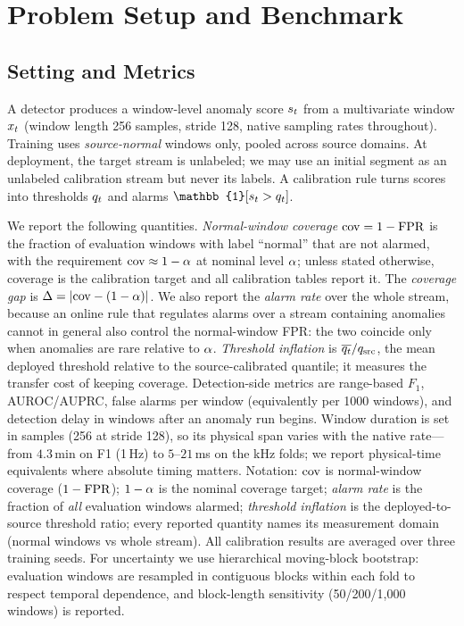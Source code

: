 \section{Problem Setup and Benchmark}
\label{sec:benchmark}

\subsection{Setting and Metrics}
\label{sec:setup-metrics}
A detector produces a window-level anomaly score $s_t$ from a multivariate window $x_t$ (window length 256 samples, stride 128, native sampling rates throughout). Training uses \emph{source-normal} windows only, pooled across source domains. At deployment, the target stream is unlabeled; we may use an initial segment as an unlabeled calibration stream but never its labels. A calibration rule turns scores into thresholds $q_t$ and alarms $\mathbb{1}[\st > \qt]$.

We report the following quantities. \emph{Normal-window coverage} $\mathrm{cov} = 1-\mathrm{FPR}$ is the fraction of evaluation windows with label ``normal'' that are not alarmed, with the requirement $\mathrm{cov} \approx 1-\alpha$ at nominal level $\alpha$; unless stated otherwise, coverage is the calibration target and all calibration tables report it. The \emph{coverage gap} is $\Delta = |\mathrm{cov}-(1-\alpha)|$. We also report the \emph{alarm rate} over the whole stream, because an online rule that regulates alarms over a stream containing anomalies cannot in general also control the normal-window FPR: the two coincide only when anomalies are rare relative to $\alpha$. \emph{Threshold inflation} is $\overline{q_t}/q_{\mathrm{src}}$, the mean deployed threshold relative to the source-calibrated quantile; it measures the transfer cost of keeping coverage. Detection-side metrics are range-based $F_1$, AUROC/AUPRC, false alarms per window (equivalently per 1000 windows), and detection delay in windows after an anomaly run begins. Window duration is set in samples (256 at stride 128), so its physical span varies with the native rate---from $4.3$\,min on F1 (1\,Hz) to $5$--$21$\,ms on the kHz folds; we report physical-time equivalents where absolute timing matters. Notation: $\mathrm{cov}$ is normal-window coverage ($1-\mathrm{FPR}$); $1-\alpha$ is the nominal coverage target; \emph{alarm rate} is the fraction of \emph{all} evaluation windows alarmed; \emph{threshold inflation} is the deployed-to-source threshold ratio; every reported quantity names its measurement domain (normal windows vs whole stream). All calibration results are averaged over three training seeds. For uncertainty we use hierarchical moving-block bootstrap: evaluation windows are resampled in contiguous blocks within each fold to respect temporal dependence, and block-length sensitivity (50/200/1{,}000 windows) is reported.

